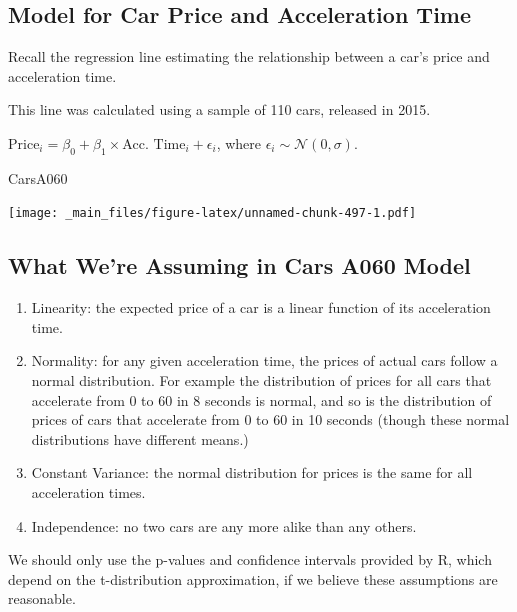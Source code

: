 \documentclass[]{book}
\newenvironment{Shaded}{\begin{snugshade}}{\end{snugshade}}
\newcommand{\NormalTok}[1]{#1}
\begin{document}
\subsection{Model for Car Price and Acceleration
Time}\label{model-for-car-price-and-acceleration-time-1}

Recall the regression line estimating the relationship between a car's
price and acceleration time.

This line was calculated using a sample of 110 cars, released in 2015.

\(\text{Price}_i = \beta_0 + \beta_1\times\text{Acc. Time}_i + \epsilon_i\),
where \(\epsilon_i\sim\mathcal{N}(0, \sigma)\).

\begin{Shaded}
\begin{Highlighting}[]
\NormalTok{CarsA060}
\end{Highlighting}
\end{Shaded}

\texttt{[image: \_main\_files/figure-latex/unnamed-chunk-497-1.pdf]}

\subsection{What We're Assuming in Cars A060
Model}\label{what-were-assuming-in-cars-a060-model}

\begin{enumerate}
\def\labelenumi{\arabic{enumi}.}
\item
  Linearity: the expected price of a car is a linear function of its
  acceleration time.
\item
  Normality: for any given acceleration time, the prices of actual cars
  follow a normal distribution. For example the distribution of prices
  for all cars that accelerate from 0 to 60 in 8 seconds is normal, and
  so is the distribution of prices of cars that accelerate from 0 to 60
  in 10 seconds (though these normal distributions have different
  means.)
\item
  Constant Variance: the normal distribution for prices is the same for
  all acceleration times.
\item
  Independence: no two cars are any more alike than any others.
\end{enumerate}

We should only use the p-values and confidence intervals provided by R,
which depend on the t-distribution approximation, if we believe these
assumptions are reasonable.
\end{document}
